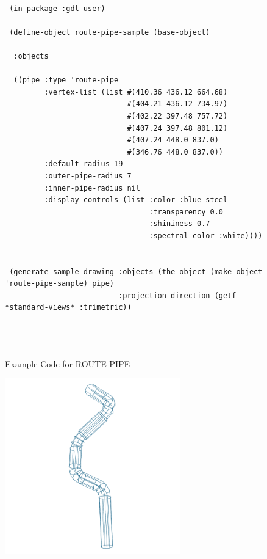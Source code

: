 \documentclass [11pt]{book}
\begin{document}
\begin{itemize}
\begin{description}
\end{description}




\begin{figure}
\begin{lrbox}{\boxedverb}
\begin{minipage}{\linewidth}
{\small

\begin{verbatim}

 (in-package :gdl-user)  

 (define-object route-pipe-sample (base-object)

  :objects

  ((pipe :type 'route-pipe
         :vertex-list (list #(410.36 436.12 664.68) 
                            #(404.21 436.12 734.97) 
                            #(402.22 397.48 757.72) 
                            #(407.24 397.48 801.12) 
                            #(407.24 448.0 837.0)
                            #(346.76 448.0 837.0))
         :default-radius 19
         :outer-pipe-radius 7
         :inner-pipe-radius nil
         :display-controls (list :color :blue-steel 
                                 :transparency 0.0 
                                 :shininess 0.7 
                                 :spectral-color :white))))

 
 (generate-sample-drawing :objects (the-object (make-object 'route-pipe-sample) pipe)
                          :projection-direction (getf *standard-views* :trimetric))
  



\end{verbatim}}
\end{minipage}
\end{lrbox}
\fbox{\usebox{\boxedverb}}

\caption{Example Code for ROUTE-PIPE}

\label{fig:example-code-ROUTE-PIPE}

\end{figure}

\begin{figure}
\begin{center}
\includegraphics[width=3in,height=3in]{../images/example-ROUTE-PIPE.pdf}
\end{center}


\end{figure}
\end{itemize}
\end{document}

